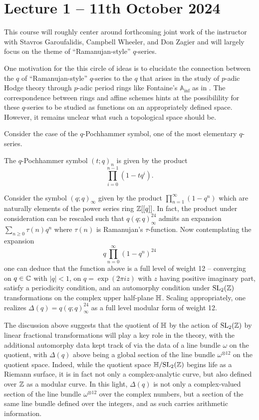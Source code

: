 \section{Lecture 1 -- 11th October 2024}\label{sec: lecture 1}
This course will roughly center around forthcoming joint work of the instructor with Stavros Garoufalidis, Campbell Wheeler, and Don Zagier \cite{HabiroNumberField} and will largely focus on the theme of ``Ramanujan-style'' $q$-series. 

One motivation for the this circle of ideas is to elucidate the connection between the $q$ of ``Ramanujan-style'' $q$-series to the $q$ that arises in the study of $p$-adic Hodge theory through $p$-adic period rings like Fontaine's $\mathbb{A}_{\inf}$ as in \cite{qDeformations}. The correspondence between rings and affine schemes hints at the possibilility for these $q$-series to be studied as functions on an appropriately defined space. However, it remains unclear what such a topological space should be. 

Consider the case of the $q$-Pochhammer symbol, one of the most elementary $q$-series. 
\begin{definition}[$q$-Pochhammer]\label{def: q-Pochhammer}
    The $q$-Pochhammer symbol $(t;q)_{n}$ is given by the product 
    $$\prod_{i=0}^{n-1}(1-tq^{i}).$$
\end{definition}
Consider the symbol $(q;q)_{\infty}$ given by the product $\prod_{n=1}^{\infty}(1-q^{n})$ which are naturally elements of the power series ring $\mathbb{Z}[[q]]$. In fact, the product under consideration can be rescaled such that $q(q;q)_{\infty}^{24}$ admits an expansion $\sum_{n\geq0}\tau(n)q^{n}$ where $\tau(n)$ is Ramanujan's $\tau$-function. Now contemplating the expansion 
$$q\prod_{n=0}^{\infty}(1-q^{n})^{24}$$
one can deduce that the function above is a full level of weight 12 -- converging on $q\in\mathbb{C}$ with $|q|<1$, on $q=\exp(2\pi i z)$ with $z$ having positive imaginary part, satisfy a periodicity condition, and an automorphy condition under $\mathrm{SL}_{2}(\mathbb{Z})$ transformations on the complex upper half-plane $\mathbb{H}$. Scaling appropriately, one realizes $\Delta(q)=q(q;q)_{\infty}^{24}$ as a full level modular form of weight 12.

The discussion above suggests that the quotient of $\mathbb{H}$ by the action of $\mathrm{SL}_{2}(\mathbb{Z})$ by linear fractional transformations will play a key role in the theory, with the additional automorphy data kept track of via the data of a line bundle $\omega$ on the quotient, with $\Delta(q)$ above being a global section of the line bundle $\omega^{\otimes 12}$ on the quotient space. Indeed, while the quotient space $\mathbb{H}/\mathrm{SL}_{2}(\mathbb{Z})$ begins life as a Riemann surface, it is in fact not only a complex-analytic curve, but also defined over $\mathbb{Z}$ as a modular curve. In this light, $\Delta(q)$ is not only a complex-valued section of the line bundle $\omega^{\otimes 12}$ over the complex numbers, but a section of the same line bundle defined over the integers, and as such carries arithmetic information.
 

